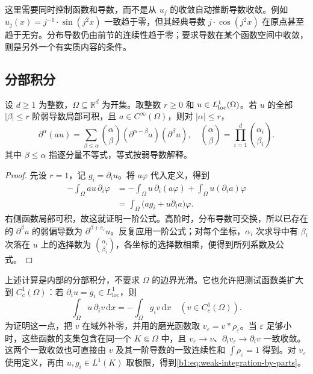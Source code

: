 \ProseParagraphBreak

这里需要同时控制函数和导数，而不是从 \(u_j\) 的收敛自动推断导数收敛。例如 \(u_j(x)=j^{-1}\cdot \sin(j^2x)\) 一致趋于零，但其经典导数 \(j\cdot \cos(j^2x)\) 在原点甚至趋于无穷。分布导数仍由前节的连续性趋于零；要求导数在某个函数空间中收敛，则是另外一个有实质内容的条件。

\subsection{分部积分}
\label{b1:subsec:200403}

\begin{proposition}[Leibniz]
\label{b1:prop:weak-leibniz}
设 \(d\geq1\) 为整数，\(\Omega\subseteq\mathbb R^d\) 为开集。取整数 \(r\geq0\) 和 \(u\in L^1_{\rm loc}(\Omega)\)。若 \(u\) 的全部 \(|\beta|\leq r\) 阶弱导数局部可积，且 \(a\in C^\infty(\Omega)\)，则对 \(|\alpha|\leq r\)，
\[
 \partial^\alpha(au)
 =\sum_{\beta\leq\alpha}\binom\alpha\beta
    (\partial^{\alpha-\beta}a)(\partial^\beta u),
 \quad
 \binom\alpha\beta=\prod_{i=1}^d\binom{\alpha_i}{\beta_i}.
\]
其中 \(\beta\leq\alpha\) 指逐分量不等式，等式按弱导数解释。
\end{proposition}
\begin{proof}
先设 \(r=1\)，记 \(g_i=\partial_i u\)。将 \(a\varphi\) 代入定义，得到
\[
 \begin{aligned}
 -\int_\Omega au\,\partial_i\varphi
 &=-\int_\Omega u\,\partial_i(a\varphi)
    +\int_\Omega u(\partial_i a)\varphi\\
 &=\int_\Omega\bigl(ag_i+u\partial_i a\bigr)\varphi.
 \end{aligned}
\]
右侧函数局部可积，故这就证明一阶公式。高阶时，分布导数可交换，所以已存在的 \(\partial^\beta u\) 的弱偏导数为 \(\partial^{\beta+e_i}u\)。反复应用一阶公式；对每个坐标，\(\alpha_i\) 次求导中有 \(\beta_i\) 次落在 \(u\) 上的选择数为 \(\binom{\alpha_i}{\beta_i}\)，各坐标的选择数相乘，便得到所列系数及公式。
\end{proof}

上述计算是内部的分部积分，不要求 \(\Omega\) 的边界光滑。它也允许把测试函数类扩大到 \(C_c^1(\Omega)\)：若 \(\partial_i u=g_i\in L^1_{\mathrm{loc}}\)，则
\begin{equation}
\label{b1:eq:weak-integration-by-parts}
 \int_\Omega u\,\partial_i v\,\mathrm dx
 =-\int_\Omega g_i v\,\mathrm dx
 \quad(v\in C_c^1(\Omega)).
\end{equation}
为证明这一点，把 \(v\) 在域外补零，并用的磨光函数取 \(v_\varepsilon=v*\rho_\varepsilon\)。当 \(\varepsilon\) 足够小时，这些函数的支集包含在同一个 \(K\Subset\Omega\) 中，且 \(v_\varepsilon\rightarrow v\)、\(\partial_i v_\varepsilon\rightarrow\partial_i v\) 一致收敛。这两个一致收敛也可直接由 \(v\) 及其一阶导数的一致连续性和 \(\int\rho_\varepsilon=1\) 得到。对 \(v_\varepsilon\) 使用定义，再由 \(u,g_i\in L^1(K)\) 取极限，得到\eqref{b1:eq:weak-integration-by-parts}。

